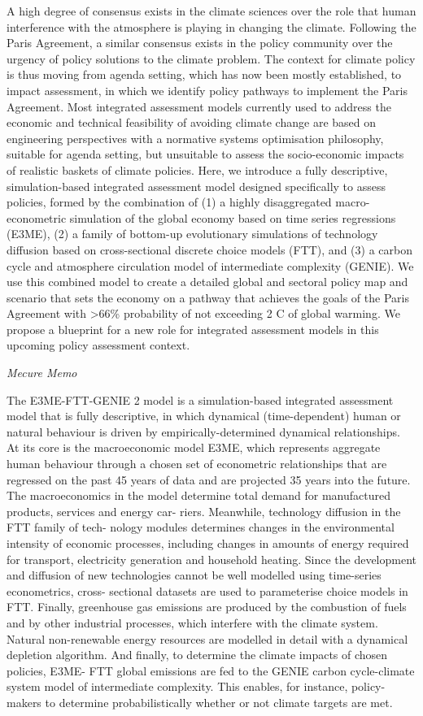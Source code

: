 \documentclass[
]{book}
\begin{document}
A high degree of consensus exists in the climate sciences over the role that human interference with the
atmosphere is playing in changing the climate. Following the Paris Agreement, a similar consensus exists
in the policy community over the urgency of policy solutions to the climate problem. The context for
climate policy is thus moving from agenda setting, which has now been mostly established, to impact
assessment, in which we identify policy pathways to implement the Paris Agreement. Most integrated
assessment models currently used to address the economic and technical feasibility of avoiding climate
change are based on engineering perspectives with a normative systems optimisation philosophy,
suitable for agenda setting, but unsuitable to assess the socio-economic impacts of realistic baskets of
climate policies. Here, we introduce a fully descriptive, simulation-based integrated assessment model
designed speciﬁcally to assess policies, formed by the combination of (1) a highly disaggregated macro-
econometric simulation of the global economy based on time series regressions (E3ME), (2) a family of
bottom-up evolutionary simulations of technology diffusion based on cross-sectional discrete choice
models (FTT), and (3) a carbon cycle and atmosphere circulation model of intermediate complexity
(GENIE). We use this combined model to create a detailed global and sectoral policy map and scenario
that sets the economy on a pathway that achieves the goals of the Paris Agreement with \textgreater66\% probability
of not exceeding 2 C of global warming. We propose a blueprint for a new role for integrated assessment
models in this upcoming policy assessment context.

\emph{Mecure Memo}

The E3ME-FTT-GENIE 2 model is a simulation-based integrated
assessment model that is fully descriptive, in which dynamical
(time-dependent) human or natural behaviour is driven by
empirically-determined dynamical relationships. At its core is the
macroeconomic model E3ME, which represents aggregate human
behaviour through a chosen set of econometric relationships that
are regressed on the past 45 years of data and are projected 35
years into the future. The macroeconomics in the model determine
total demand for manufactured products, services and energy car-
riers. Meanwhile, technology diffusion in the FTT family of tech-
nology modules determines changes in the environmental
intensity of economic processes, including changes in amounts of
energy required for transport, electricity generation and household
heating. Since the development and diffusion of new technologies
cannot be well modelled using time-series econometrics, cross-
sectional datasets are used to parameterise choice models in FTT.
Finally, greenhouse gas emissions are produced by the combustion
of fuels and by other industrial processes, which interfere with the
climate system. Natural non-renewable energy resources are
modelled in detail with a dynamical depletion algorithm. And
ﬁnally, to determine the climate impacts of chosen policies, E3ME-
FTT global emissions are fed to the GENIE carbon cycle-climate
system model of intermediate complexity. This enables, for
instance, policy-makers to determine probabilistically whether or
not climate targets are met.
\end{document}
